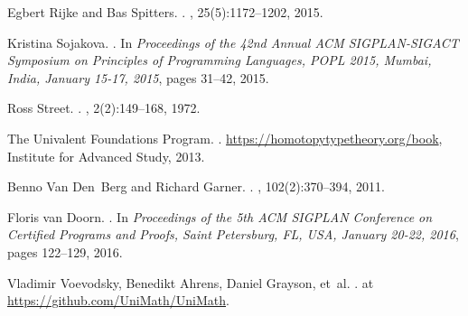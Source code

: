 \documentclass[9pt]{entcs}
\newcommand{\0}{\textbf{0}} %
\begin{document}
\begin{thebibliography}{10}
	Egbert Rijke and Bas Spitters.
	.
	, 25(5):1172--1202,
	2015.
	
	Kristina Sojakova.
	.
	\newblock In {\em Proceedings of the 42nd Annual {ACM} {SIGPLAN-SIGACT}
		Symposium on Principles of Programming Languages, {POPL} 2015, Mumbai, India,
		January 15-17, 2015}, pages 31--42, 2015.
	
	Ross Street.
	.
	, 2(2):149--168, 1972.
	
	{The Univalent Foundations Program}.
	.
	\newblock \url{https://homotopytypetheory.org/book}, Institute for Advanced
	Study, 2013.
	
	Benno Van Den~Berg and Richard Garner.
	.
	,
	102(2):370--394, 2011.
	
	Floris van Doorn.
	.
	\newblock In {\em Proceedings of the 5th {ACM} {SIGPLAN} Conference on
		Certified Programs and Proofs, Saint Petersburg, FL, USA, January 20-22,
		2016}, pages 122--129, 2016.
	
	Vladimir Voevodsky, Benedikt Ahrens, Daniel Grayson, et~al.
	.
	 at \url{https://github.com/UniMath/UniMath}.
	
\end{thebibliography}
\end{document}
